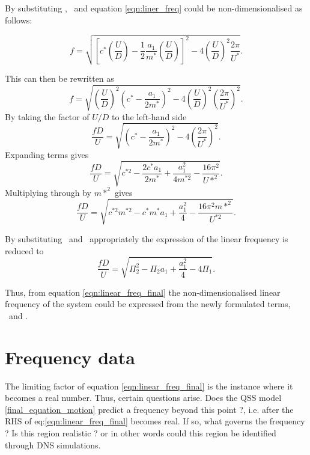 By substituting \cstar, \mstar\ and \ustar equation \ref{eqn:liner_freq} could be non-dimensionalised as follows:

\begin{equation}
f = \sqrt{\left[c^*\left(\frac{U}{D}\right) - \frac{1}{2}\frac{a_1}{m^*}\left(\frac{U}{D}\right)\right]^2 - 4\left(\frac{U}{D}\right)^2\frac{2\pi}{U^*}}.
\end{equation}

This can then be rewritten as
\begin{equation}
f = \sqrt{\left(\frac{U}{D}\right)^2\left(c^*-\frac{a_1}{2m^*}\right)^2 - 4\left(\frac{U}{D}\right)^2\left(\frac{2\pi}{U^*}\right)^2}.
\end{equation}
By taking the factor of $U/D$ to the left-hand side
\begin{equation}
\frac{fD}{U} = \sqrt{\left(c^*-\frac{a_1}{2m^*}\right)^2 - 4\left(\frac{2\pi}{U^*}\right)^2}.
\end{equation}
Expanding terms gives
\begin{equation}
\frac{fD}{U} = \sqrt{c^{*2} - \frac{2c^*a_1}{2m^*} + \frac{a_1^2}{4m^{*2}} - \frac{16\pi^2}{U*^2}}.
\end{equation}
Multiplying through by $m*^2$ gives
\begin{equation}
\frac{fD}{U} = \sqrt{c^{*2}m^{*2} - c^*m^*a_1 + \frac{a_1^2}{4} - \frac{16\pi^2m{*^2}}{U^{*2}}}.
\end{equation}


By substituting \massstiff\ and \massdamp\ appropriately the expression of the linear frequency is reduced to   
\begin{equation}
\label{eqn:linear_freq_final}
\frac{fD}{U} = \sqrt{\Pi_2^2 - \Pi_2a_1 + \frac{a_1^2}{4} - 4\Pi_1}.
\end{equation}

Thus, from equation \ref{eqn:linear_freq_final} the non-dimensionalised linear frequency of the system could be expressed from the newly formulated terms, \massstiff\ and \massdamp.

\section{Frequency data}

The limiting factor of equation \ref{eqn:linear_freq_final} is the instance where it becomes a real number. Thus, certain questions arise. Does the QSS model \ref{final_equation_motion} predict a frequency beyond this point ?, i.e. after the RHS of eq:\ref{eqn:linear_freq_final} becomes real. If so, what governs the frequency ? Is this region realistic ? or in other words could this region be identified through DNS simulations. 

